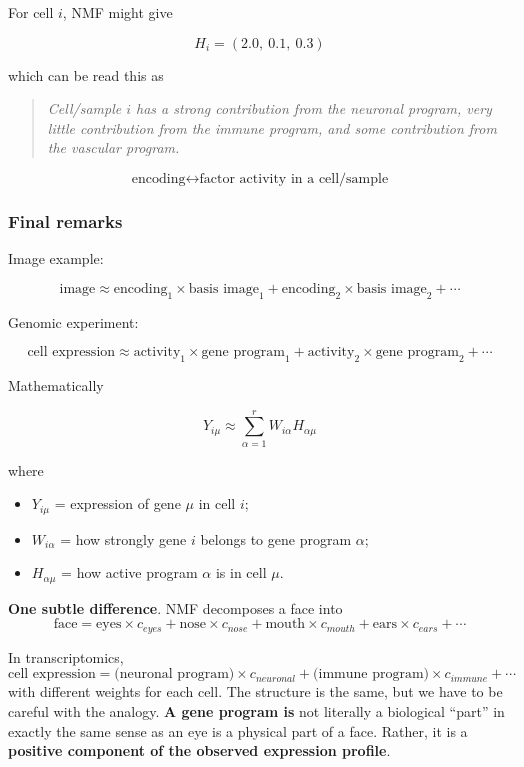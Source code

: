 \documentclass[11pt,a4paper]{article}
\begin{document}
For cell $i$, NMF might give

\[
H_i=(2.0,~0.1,~0.3)
\]

which can be read this as

\begin{quote}
\textit{Cell/sample $i$ has a strong contribution from the neuronal program, very little contribution from the immune program, and some contribution from the vascular program.}
\end{quote}

\[
\boxed{
\text{encoding}
\longleftrightarrow
\text{factor activity in a cell/sample}
}
\]

\subsubsection{Final remarks}

Image example:

\[
\boxed{
\text{image}
\approx
\text{encoding}_1\times\text{basis image}_1
+
\text{encoding}_2\times\text{basis image}_2
+\cdots
}
\]

Genomic experiment:

\[
\boxed{
\text{cell expression}
\approx
\text{activity}_1\times\text{gene program}_1
+
\text{activity}_2\times\text{gene program}_2
+\cdots
}
\]

Mathematically

\[ 
Y_{i \mu} \approx \sum_{\alpha = 1}^r W_{i \alpha} H_{\alpha \mu}
\]

where

\begin{itemize}
    \item $Y_{i\mu}$ = expression of gene $\mu$ in cell $i$;
    \item $W_{i\alpha}$ = how strongly gene $i$ belongs to gene program $\alpha$;
    \item $H_{\alpha \mu}$ = how active program $\alpha$ is in cell $\mu$.
\end{itemize}

\vspace{5mm}

\textbf{One subtle difference}. NMF decomposes a face into
\[
\text{face}
=
\text{eyes} \times c_{eyes}
+
\text{nose} \times c_{nose}
+
\text{mouth} \times c_{mouth}
+
\text{ears} \times c_{ears} 
+
\cdots 
\]

In transcriptomics,
\[
\text{cell expression}
=
\text{(neuronal program)} \times c_{neuronal}
+
\text{(immune program)} \times c_{immune}
+\cdots
\]
with different weights for each cell. The structure is the same, but we have to be careful with the analogy.\textbf{ A gene program is} not literally a biological ``part'' in exactly the same sense as an eye is a physical part of a face. Rather, it is a \textbf{positive component of the observed expression profile}.
\end{document}
